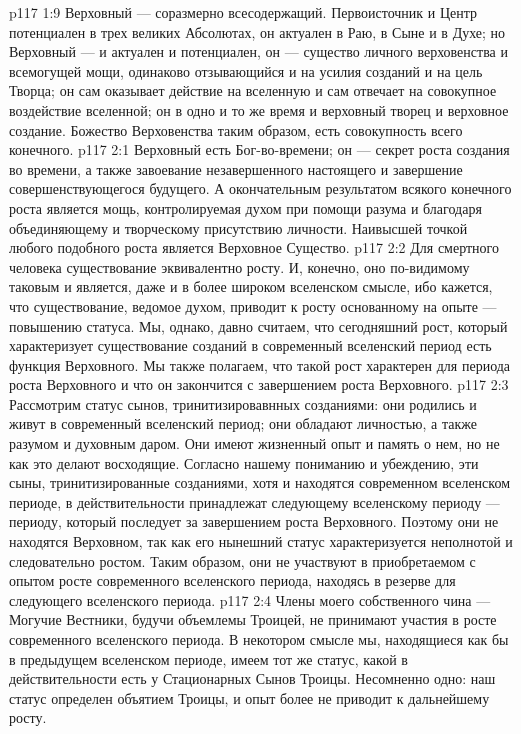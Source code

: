 \vs p117 1:9 Верховный --- соразмерно всесодержащий. Первоисточник и Центр потенциален в трех великих Абсолютах, он актуален в Раю, в Сыне и в Духе; но Верховный --- и актуален и потенциален, он --- существо личного верховенства и всемогущей мощи, одинаково отзывающийся и на усилия созданий и на цель Творца; он сам оказывает действие на вселенную и сам отвечает на совокупное воздействие вселенной; он в одно и то же время и верховный творец и верховное создание. Божество Верховенства таким образом, есть совокупность всего конечного.
\vs p117 2:1 Верховный есть Бог\hyp{}во\hyp{}времени; он --- секрет роста создания во времени, а также завоевание незавершенного настоящего и завершение совершенствующегося будущего. А окончательным результатом всякого конечного роста является мощь, контролируемая духом при помощи разума и благодаря объединяющему и творческому присутствию личности. Наивысшей точкой любого подобного роста является Верховное Существо.
\vs p117 2:2 Для смертного человека существование эквивалентно росту. И, конечно, оно по\hyp{}видимому таковым и является, даже и в более широком вселенском смысле, ибо кажется, что существование, ведомое духом, приводит к росту основанному на опыте --- повышению статуса. Мы, однако, давно считаем, что сегодняшний рост, который характеризует существование созданий в современный вселенский период есть функция Верховного. Мы также полагаем, что такой рост характерен для периода роста Верховного и что он закончится с завершением роста Верховного.
\vs p117 2:3 \pc Рассмотрим статус сынов, тринитизировавнных созданиями: они родились и живут в современный вселенский период; они обладают личностью, а также разумом и духовным даром. Они имеют жизненный опыт и память о нем, но не  как это делают восходящие. Согласно нашему пониманию и убеждению, эти сыны, тринитизированные созданиями, хотя и находятся  современном вселенском периоде, в действительности принадлежат  следующему вселенскому периоду --- периоду, который последует за завершением роста Верховного. Поэтому они не находятся  Верховном, так как его нынешний статус характеризуется неполнотой и следовательно ростом. Таким образом, они не участвуют в приобретаемом с опытом росте современного вселенского периода, находясь в резерве для следующего вселенского периода.
\vs p117 2:4 Члены моего собственного чина --- Могучие Вестники, будучи объемлемы Троицей, не принимают участия в росте современного вселенского периода. В некотором смысле мы, находящиеся как бы в предыдущем вселенском периоде, имеем тот же статус, какой в действительности есть у Стационарных Сынов Троицы. Несомненно одно: наш статус определен объятием Троицы, и опыт более не приводит к дальнейшему росту.

